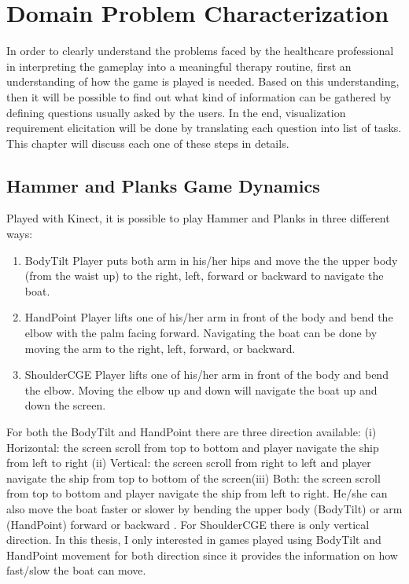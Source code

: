 \chapter{Domain Problem Characterization}
\label{chap:back}

In order to clearly understand the problems faced by the healthcare professional in interpreting the gameplay into a meaningful therapy routine, first an understanding of how the game is played is needed. Based on this understanding, then it will be possible to find out what kind of information can be gathered by defining questions usually asked by the users. In the end, visualization requirement elicitation will be done by translating each question into list of tasks. This chapter will discuss each one of these steps in details.

\section{Hammer and Planks Game Dynamics}

Played with Kinect, it is possible to play Hammer and Planks in three different ways:
\begin{enumerate}
  \item BodyTilt
  Player puts both arm in his/her hips and move the the upper body (from the waist up) to the right, left, forward or backward to navigate the boat. 
  \item HandPoint
  Player lifts one of his/her arm in front of the body and bend the elbow with the palm facing forward. Navigating the boat can be done by moving the arm to the right, left, forward, or backward.
  \item ShoulderCGE
  Player lifts one of his/her arm in front of the body and bend the elbow. Moving the elbow up and down will navigate the boat up and down the screen.
\end{enumerate}

For both the BodyTilt and HandPoint there are three direction available: (i) Horizontal: the screen scroll from top to bottom and player navigate the ship from left to right (ii) Vertical: the screen scroll from right to left and player navigate the ship from top to bottom of the screen(iii) Both: the screen scroll from top to bottom and player navigate the ship from left to right. He/she can also move the boat faster or slower by bending the upper body (BodyTilt) or arm (HandPoint) forward or backward . For ShoulderCGE there is only vertical direction. In this thesis, I only interested in games played using BodyTilt and HandPoint movement for both direction since it provides the information on how fast/slow the boat can move.

